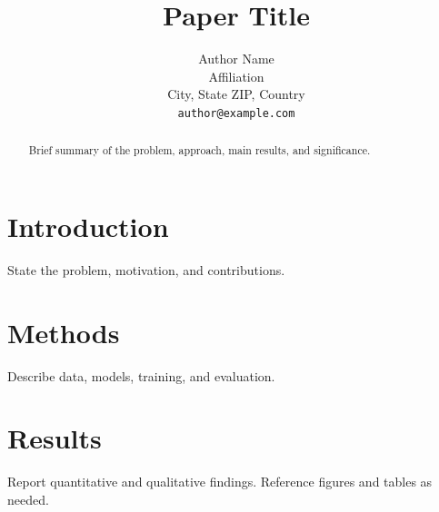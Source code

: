 \documentclass{article}
\title{Paper Title}
\author{
  Author Name \\
  Affiliation \\
  City, State ZIP, Country \\
  \texttt{author@example.com}
}
\begin{document}
\maketitle

\begin{abstract}
Brief summary of the problem, approach, main results, and significance.
\end{abstract}


\section{Introduction}
\label{sec:intro}

State the problem, motivation, and contributions.

\section{Methods}
\label{sec:methods}

Describe data, models, training, and evaluation.

\section{Results}
\label{sec:results}

Report quantitative and qualitative findings. Reference figures and tables as needed.


\end{document}
